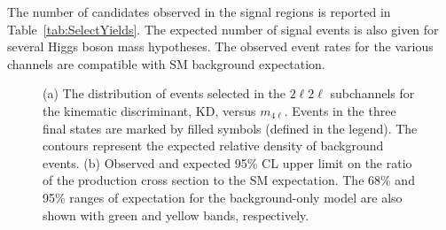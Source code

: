 The number of candidates observed in the signal regions 
is reported in Table~\ref{tab:SelectYields}.
The expected number of signal events is also given for several Higgs boson mass hypotheses.
The observed event rates for the various channels are compatible with SM background expectation.
%
\begin{figure}[htbp]
\begin{center}
%
%
\caption{ (a) 
The distribution of events
selected in the $2\ell2\ell$ 
subchannels for the kinematic discriminant, KD, versus $m_{4\ell}$.
Events in the three final states are marked by filled symbols (defined in the legend).
The contours represent the expected relative density of background events.
(b) Observed and expected 95\% CL upper limit on the ratio of the production cross section to the 
SM expectation.
The 68\% and 95\% ranges of expectation  for the background-only model 
are also shown with green and yellow bands, respectively.
}
\label{fig:KDvsM4lFullMass}
\end{center}
\end{figure}

